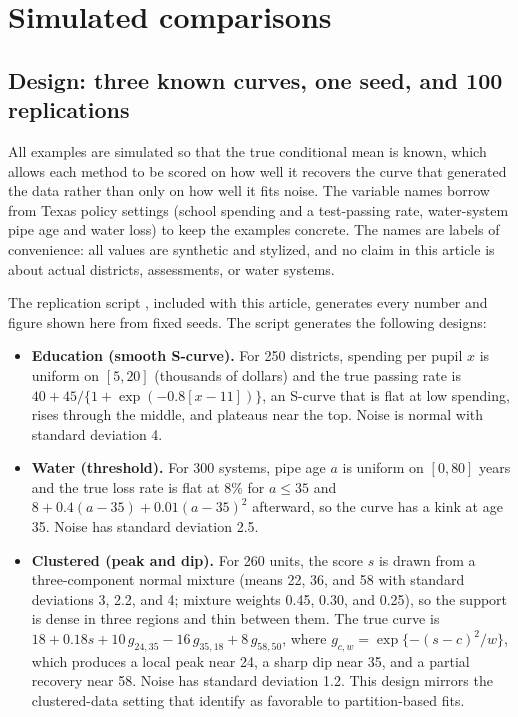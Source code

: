 \documentclass[bib]{statapress}
\begin{document}
\begin{stlog}
\nullskip
\end{stlog}

\section{Simulated comparisons}
\label{sec:sims}

\subsection{Design: three known curves, one seed, and 100 replications}

All examples are simulated so that the true conditional mean is known, which
allows each method to be scored on how well it recovers the curve that generated
the data rather than only on how well it fits noise.  The variable names borrow from Texas policy settings (school
spending and a test-passing rate, water-system pipe age and water loss) to
keep the examples concrete.  The names are labels of convenience: all values
are synthetic and stylized, and no claim in this article is about actual
districts, assessments, or water systems.

The replication script , included with this article,
generates every number and figure shown here from fixed seeds.  The script
generates the following designs:

\begin{itemize}
\item \textbf{Education (smooth S-curve).}  For 250 districts, spending per
pupil $x$ is uniform on $[5, 20]$ (thousands of dollars) and the true passing
rate is $40 + 45/\{1+\exp(-0.8[x-11])\}$, an S-curve that is flat at low
spending, rises through the middle, and plateaus near the top.  Noise is
normal with standard deviation 4.
\item \textbf{Water (threshold).}  For 300 systems, pipe age $a$ is uniform
on $[0, 80]$ years and the true loss rate is flat at 8\% for $a \le 35$ and
$8 + 0.4(a-35) + 0.01(a-35)^2$ afterward, so the curve has a kink at age 35.
Noise has standard deviation 2.5.
\item \textbf{Clustered (peak and dip).}  For 260 units, the score $s$ is
drawn from a three-component normal mixture (means 22, 36, and 58 with
standard deviations 3, 2.2, and 4; mixture weights 0.45, 0.30, and 0.25), so
the support is dense in three regions and thin between them.  The true curve
is $18 + 0.18s + 10\,g_{24,35} - 16\,g_{35,18} + 8\,g_{58,50}$, where
$g_{c,w}=\exp\{-(s-c)^2/w\}$, which produces a local peak near 24, a sharp dip
near 35, and a partial recovery near 58.  Noise has standard deviation 1.2.
This design mirrors the clustered-data setting that
\citet{vinod_viole_2018_clusters} identify as favorable to partition-based
fits.
\end{itemize}
\end{document}
